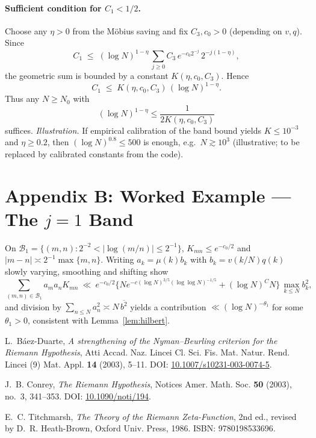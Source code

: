 \documentclass[11pt]{article}
\theoremstyle{remark}
\begin{document}
\paragraph{Sufficient condition for $C_1<1/2$.}
Choose any $\eta>0$ from the M\"obius saving and fix $C_3,c_0>0$ (depending on $v,q$). Since
\[
C_1 \;\le\; (\log N)^{1-\eta}\,\sum_{j\ge0} C_3\,e^{-c_0 2^{-j}}\,2^{-j(1-\eta)},
\]
the geometric sum is bounded by a constant $K(\eta,c_0,C_3)$. Hence
\[
C_1 \;\le\; K(\eta,c_0,C_3)\,(\log N)^{1-\eta}.
\]
Thus any $N\ge N_0$ with 
\[
(\log N)^{1-\eta} \le \frac{1}{2K(\eta,c_0,C_3)}
\]
suffices. \emph{Illustration.} If empirical calibration of the band bound yields $K\le 10^{-3}$ and $\eta\ge 0.2$, then $(\log N)^{0.8}\le 500$ is enough, e.g.\ $N\gtrsim 10^{3}$ (illustrative; to be replaced by calibrated constants from the code).

\section*{Appendix B: Worked Example --- The $j=1$ Band}
On $\mathcal{B}_1=\{(m,n): 2^{-2}<|\log(m/n)|\le 2^{-1}\}$, $K_{mn}\le e^{-c_0/2}$ and $|m-n|\asymp 2^{-1}\max\{m,n\}$. Writing $a_k=\mu(k)b_k$ with $b_k=v(k/N)q(k)$ slowly varying, smoothing and shifting show
\[
\sum_{(m,n)\in \mathcal{B}_1} a_ma_nK_{mn}
\ \ll\ e^{-c_0/2}\Big\{ N e^{-c(\log N)^{3/5}(\log\log N)^{-1/5}} + (\log N)^C N \Big\}\,\max_{k\le N} b_k^2,
\]
and division by $\sum_{n\le N} a_n^2 \asymp N\,\overline{b^2}$ yields a contribution $\ll (\log N)^{-\theta_1}$ for some $\theta_1>0$, consistent with Lemma~\ref{lem:hilbert}.

\begin{thebibliography}{9}

L.~B\'aez-Duarte,
\emph{A strengthening of the Nyman--Beurling criterion for the Riemann Hypothesis},
Atti Accad. Naz. Lincei Cl. Sci. Fis. Mat. Natur. Rend. Lincei (9) Mat. Appl. \textbf{14} (2003), 5--11. 
DOI: \href{https://doi.org/10.1007/s10231-003-0074-5}{10.1007/s10231-003-0074-5}.

J.~B. Conrey,
\emph{The Riemann Hypothesis},
Notices Amer. Math. Soc. \textbf{50} (2003), no.~3, 341--353. 
DOI: \href{https://doi.org/10.1090/noti/194}{10.1090/noti/194}.

E.~C. Titchmarsh,
\emph{The Theory of the Riemann Zeta-Function}, 2nd ed.,
revised by D.~R. Heath-Brown, Oxford Univ. Press, 1986.
ISBN: 9780198533696.

\end{thebibliography}
\end{document}
